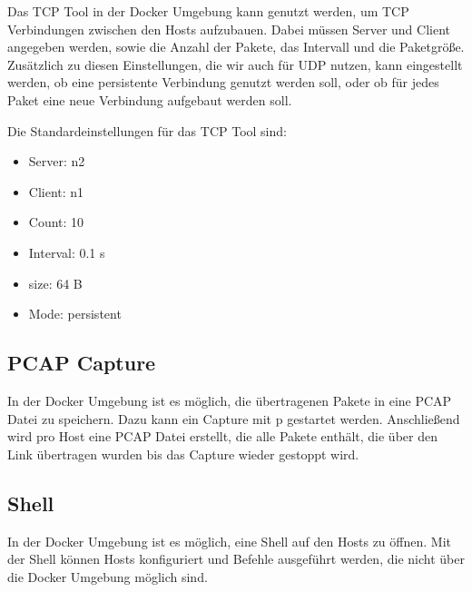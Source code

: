 Das TCP Tool in der Docker Umgebung kann genutzt werden, um TCP Verbindungen zwischen den Hosts aufzubauen.
Dabei müssen Server und Client angegeben werden, sowie die Anzahl der Pakete, das Intervall und die Paketgröße.
Zusätzlich zu diesen Einstellungen, die wir auch für UDP nutzen, kann eingestellt werden, ob eine persistente Verbindung genutzt werden soll, oder ob für jedes Paket eine neue Verbindung aufgebaut werden soll.

Die Standardeinstellungen für das TCP Tool sind:
\begin{itemize}[noitemsep]
    \item Server: n2
    \item Client: n1
    \item Count: 10
    \item Interval: 0.1 s
    \item size: 64 B
    \item Mode: persistent
\end{itemize}

\subsection{PCAP Capture}
\label{sec:pcap_docker_capture}

In der Docker Umgebung ist es möglich, die übertragenen Pakete in eine PCAP Datei zu speichern.
Dazu kann ein Capture mit p gestartet werden.
Anschließend wird pro Host eine PCAP Datei erstellt, die alle Pakete enthält, die über den Link übertragen wurden bis das Capture wieder gestoppt wird.

\subsection{Shell} \label{sec:shell_docker_tool}

In der Docker Umgebung ist es möglich, eine Shell auf den Hosts zu öffnen.
Mit der Shell können Hosts konfiguriert und Befehle ausgeführt werden, die nicht über die Docker Umgebung möglich sind.

